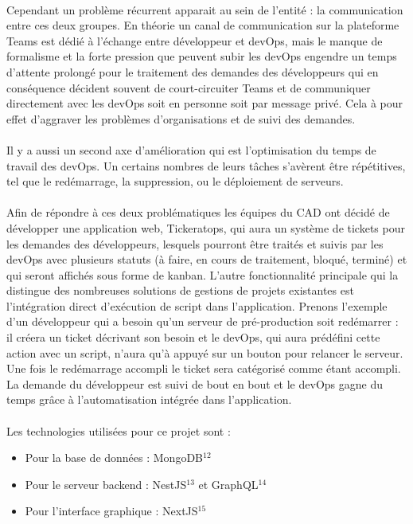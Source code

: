 \documentclass[12pt]{article}
\begin{document}
\begin {sloppypar}
\paragraph{}
Cependant un problème récurrent apparait au sein de l'entité : la communication entre ces deux 
groupes. En théorie un canal de communication sur la plateforme Teams est dédié à l'échange 
entre développeur et devOps, mais le manque de formalisme et la forte pression que peuvent 
subir les devOps engendre un temps d'attente prolongé pour le traitement des demandes des développeurs
qui en conséquence décident souvent de court-circuiter Teams et de communiquer directement
avec les devOps soit en personne soit par message privé. Cela à pour effet d'aggraver les problèmes
d'organisations et de suivi des demandes. 
\paragraph{}
Il y a aussi un second axe d'amélioration qui est l'optimisation du temps de travail des devOps. 
Un certains nombres de leurs tâches s'avèrent être répétitives, tel que le redémarrage, la suppression,
ou le déploiement de serveurs. 
\paragraph{}
Afin de répondre à ces deux problématiques les équipes du CAD ont décidé de développer une application web,
Tickeratops, qui aura un système de tickets pour les demandes des développeurs, lesquels pourront être
traités et suivis par les devOps avec plusieurs statuts (à faire, en cours de traitement, bloqué, terminé)
et qui seront affichés sous forme de kanban. L'autre fonctionnalité principale qui la distingue des 
nombreuses solutions de gestions de projets existantes est l'intégration direct d'exécution de script dans
l'application. Prenons l'exemple d'un développeur qui a besoin qu'un serveur de pré-production soit redémarrer : 
il créera un ticket décrivant son besoin et le devOps, qui aura prédéfini cette action avec un script, n'aura qu'à 
appuyé sur un bouton pour relancer le serveur. Une fois le redémarrage accompli le ticket sera catégorisé 
comme étant accompli. La demande du développeur est suivi de bout en bout et le devOps gagne du temps 
grâce à l'automatisation intégrée dans l'application.

\newpage
\paragraph{}
Les technologies utilisées pour ce projet sont : 
\begin{itemize}
  \item 
    Pour la base de données : MongoDB$^{12}$
  \item 
    Pour le serveur backend : NestJS$^{13}$ et GraphQL$^{14}$
  \item 
    Pour l'interface graphique : NextJS$^{15}$ 
\end{itemize}


\end{sloppypar}
\end{document}
